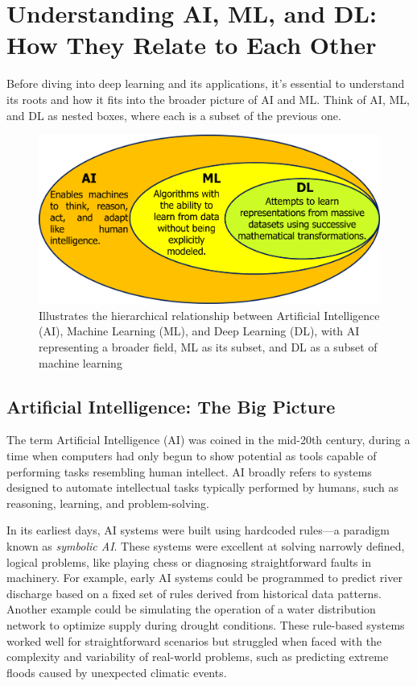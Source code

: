 \section{Understanding AI, ML, and DL: How They Relate to Each Other}
Before diving into deep learning and its applications, it’s essential to understand its roots and how it fits into the broader picture of AI and ML. Think of AI, ML, and DL as nested boxes, where each is a subset of the previous one.
\begin{figure}
    \centering
    \includegraphics[width=0.99\linewidth]{images/ai-ml-dl.png}
    \caption{Illustrates the hierarchical relationship between Artificial Intelligence (AI), Machine Learning (ML), and Deep Learning (DL), with AI representing a broader field, ML as its subset, and DL as a subset of machine learning}
    \label{fig:ai-ml-dl}
\end{figure}
\subsection{Artificial Intelligence: The Big Picture}
The term Artificial Intelligence (AI) was coined in the mid-20th century, during a time when computers had only begun to show potential as tools capable of performing tasks resembling human intellect. AI broadly refers to systems designed to automate intellectual tasks typically performed by humans, such as reasoning, learning, and problem-solving.

In its earliest days, AI systems were built using hardcoded rules—a paradigm known as \textit{symbolic AI}. These systems were excellent at solving narrowly defined, logical problems, like playing chess or diagnosing straightforward faults in machinery. For example, early AI systems could be programmed to predict river discharge based on a fixed set of rules derived from historical data patterns. Another example could be simulating the operation of a water distribution network to optimize supply during drought conditions. These rule-based systems worked well for straightforward scenarios but struggled when faced with the complexity and variability of real-world problems, such as predicting extreme floods caused by unexpected climatic events.

